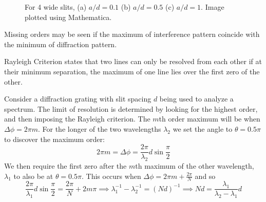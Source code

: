 \documentclass[a4paper]{article}
\begin{document}
\begin{figure}[H]
\begin{minipage}{\linewidth}
\end{minipage}
\caption{For 4 wide slits, (a) $a/d=0.1$ (b) $a/d=0.5$ (c) $a/d=1$. Image plotted using Mathematica.}
\end{figure}
\begin{cor}
Missing orders may be seen if the maximum of interference pattern coincide with the minimum of diffraction pattern.
\end{cor}
\begin{defi}
Rayleigh Criterion states that two lines can only be resolved from each other if at their minimum separation, the maximum of one line lies over the first zero of the other.
\end{defi}
\begin{eg}
Consider a diffraction grating with slit spacing $d$ being used to analyze a spectrum. The limit of resolution is determined by looking for the highest order, and then imposing the Rayleigh criterion. The $m$th order maximum will be when $\Delta\phi=2\pi m$. For the longer of the two wavelengths $\lambda_2$ we set the angle to $\theta=0.5\pi$ to discover the maximum order:
$$2\pi m=\Delta\phi=\frac{2\pi}{\lambda_2}d\sin\frac{\pi}{2}$$
We then require the first zero after the $m$th maximum of the other wavelength, $\lambda_1$ to also be at $\theta=0.5\pi$. This occurs when $\Delta\phi=2\pi m+\frac{2\pi}{N}$ and so
$$\frac{2\pi}{\lambda_1}d\sin\frac{\pi}{2}=\frac{2\pi}{N}+2m\pi\implies\lambda_1^{-1}-\lambda_2^{-1}=(Nd)^{-1}\implies Nd=\frac{\lambda_1}{\lambda_2-\lambda_1}d$$
\end{eg}
\end{document}
